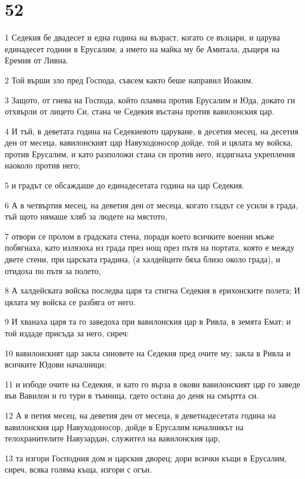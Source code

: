 \chapter{52}

\par 1 Седекия бе двадесет и една година на възраст, когато се възцари, и царува единадесет години в Ерусалим; а името на майка му бе Амитала, дъщеря на Еремия от Ливна.
\par 2 Той върши зло пред Господа, съвсем както беше направил Иоаким.
\par 3 Защото, от гнева на Господа, който пламна против Ерусалим и Юда, докато ги отхвърли от лицето Си, стана че Седекия въстана против вавилонския цар.
\par 4 И тъй, в деветата година на Седекиевото царуване, в десетия месец, на десетия ден от месеца, вавилонският цар Навуходоносор дойде, той и цялата му войска, против Ерусалим, и като разположи стана си против него, издигнаха укрепления наоколо против него;
\par 5 и градът се обсаждаше до единадесетата година на цар Седекия.
\par 6 А в четвъртия месец, на деветия ден от месеца, когато гладът се усили в града, тъй щото нямаше хляб за людете на мястото,
\par 7 отвори се пролом в градската стена, поради което всичките военни мъже побягнаха, като излязоха из града през нощ през пътя на портата, която е между двете стени, при царската градина, (а халдейците бяха близо около града), и отидоха по пътя за полето,
\par 8 А халдейската войска последва царя та стигна Седекия в ерихонските полета; И цялата му войска се разбяга от него.
\par 9 И хванаха царя та го заведоха при вавилонския цар в Ривла, в земята Емат; и той издаде присъда за него, сиреч:
\par 10 вавилонският цар закла синовете на Седекия пред очите му; закла в Ривла и всичките Юдови началници;
\par 11 и избоде очите на Седекия, и като го върза в окови вавилонският цар го заведе във Вавилон и го тури в тъмница, гдето остана до деня на смъртта си.
\par 12 А в петия месец, на деветия ден от месеца, в деветнадесетата година на вавилонския цар Навуходоносор, дойде в Ерусалим началникът на телохранителите Навузардан, служител на вавилонския цар,
\par 13 та изгори Господния дом и царския дворец; дори всички къщи в Ерусалим, сиреч, всяка голяма къща, изгори с огън.
